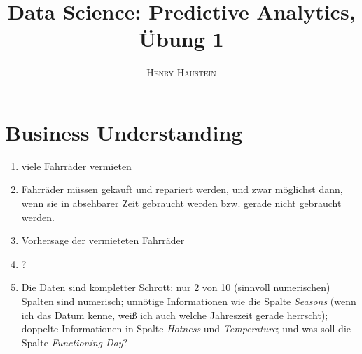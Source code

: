 \documentclass{article}
\title{\textbf{Data Science: Predictive Analytics, Übung 1}}
\author{\textsc{Henry Haustein}}
\date{}
\begin{document}
	\maketitle
	
	\section*{Business Understanding}
	\begin{enumerate}[label=(\alph*)]
		\item viele Fahrräder vermieten
		\item Fahrräder müssen gekauft und repariert werden, und zwar möglichst dann, wenn sie in absehbarer Zeit gebraucht werden bzw. gerade nicht gebraucht werden.
		\item Vorhersage der vermieteten Fahrräder
		\item ?
		\item Die Daten sind kompletter Schrott: nur 2 von 10 (sinnvoll numerischen) Spalten sind numerisch; unnötige Informationen wie die Spalte \textit{Seasons} (wenn ich das Datum kenne, weiß ich auch welche Jahreszeit gerade herrscht); doppelte Informationen in Spalte \textit{Hotness} und \textit{Temperature}; und was soll die Spalte \textit{Functioning Day}?
	\end{enumerate}
\end{document}
